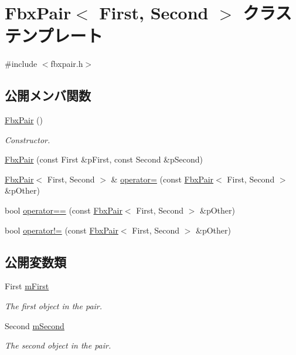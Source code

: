 \hypertarget{class_fbx_pair}{}\section{Fbx\+Pair$<$ First, Second $>$ クラステンプレート}
\label{class_fbx_pair}


{\ttfamily \#include $<$fbxpair.\+h$>$}

\subsection*{公開メンバ関数}
\begin{DoxyCompactItemize}
\item 
\hyperlink{class_fbx_pair_ae542e6310c76b51c6208724fb18f3b96}{Fbx\+Pair} ()
\begin{DoxyCompactList}\small\item\em Constructor. \end{DoxyCompactList}\item 
\hyperlink{class_fbx_pair_a7e8efc2156e23d213128de686aba4def}{Fbx\+Pair} (const First \&p\+First, const Second \&p\+Second)
\item 
\hyperlink{class_fbx_pair}{Fbx\+Pair}$<$ First, Second $>$ \& \hyperlink{class_fbx_pair_ab645f08678477ba9b74c08ff5d61bf52}{operator=} (const \hyperlink{class_fbx_pair}{Fbx\+Pair}$<$ First, Second $>$ \&p\+Other)
\item 
bool \hyperlink{class_fbx_pair_a9ada9f26dbcfd8e26b4e6df741436824}{operator==} (const \hyperlink{class_fbx_pair}{Fbx\+Pair}$<$ First, Second $>$ \&p\+Other)
\item 
bool \hyperlink{class_fbx_pair_a6a08f9caa08c3bdd093951eeeaed31bf}{operator!=} (const \hyperlink{class_fbx_pair}{Fbx\+Pair}$<$ First, Second $>$ \&p\+Other)
\end{DoxyCompactItemize}
\subsection*{公開変数類}
\begin{DoxyCompactItemize}
\item 
First \hyperlink{class_fbx_pair_ae4207e9014fead320362025388c70703}{m\+First}
\begin{DoxyCompactList}\small\item\em The first object in the pair. \end{DoxyCompactList}\item 
Second \hyperlink{class_fbx_pair_ade45092061639a0a4256a0df59365d47}{m\+Second}
\begin{DoxyCompactList}\small\item\em The second object in the pair. \end{DoxyCompactList}\end{DoxyCompactItemize}


